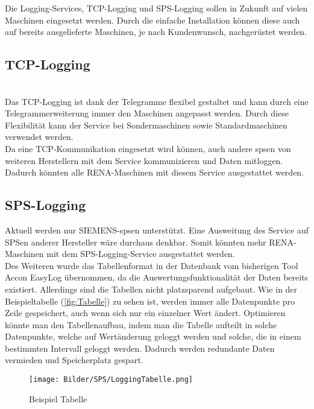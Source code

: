 Die Logging-Services, TCP-Logging  und SPS-Logging sollen in Zukunft auf vielen Maschinen eingesetzt werden. Durch die einfache Installation können diese auch auf bereits ausgelieferte Maschinen, je nach Kundenwunsch, nachgerüstet werden.
\subsection{TCP-Logging}
\ \\
Das TCP-Logging ist dank der Telegramme flexibel gestaltet und kann durch eine Telegrammerweiterung immer den Maschinen angepasst werden. Durch diese Flexibilität kann der Service bei Sondermaschinen sowie Standardmaschinen verwendet werden. 
\ \\
Da eine TCP-Kommunikation eingesetzt wird können, auch andere \ac{sps}en von weiteren Herstellern mit dem Service kommunizieren und Daten mitloggen. Dadurch könnten alle RENA-Maschinen mit diesem Service ausgestattet werden. 
\subsection{SPS-Logging}
Aktuell werden nur SIEMENS-\ac{sps}en unterstützt. Eine Ausweitung des Service auf SPSen anderer Hersteller wäre durchaus denkbar. Somit könnten mehr RENA-Maschinen mit dem SPS-Logging-Service ausgestattet werden. 
\ \\
Des Weiteren wurde das Tabellenformat in der Datenbank vom bisherigen Tool \glqq Accon EasyLog\grqq{} übernommen, da die Auswertungsfunktionalität der Daten bereits existiert. Allerdings sind die Tabellen nicht platzsparend aufgebaut. Wie in der Beispieltabelle (\autoref{fig:Tabelle}) zu sehen ist, werden immer alle Datenpunkte pro Zeile gespeichert, auch wenn sich nur ein einzelner Wert ändert. Optimieren könnte man den Tabellenaufbau, indem man die Tabelle aufteilt in solche Datenpunkte, welche auf Wertänderung geloggt werden und solche, die in einem bestimmten Intervall geloggt werden. Dadurch werden redundante Daten vermieden und Speicherplatz gespart. 

\begin{figure}
\centering
 \texttt{[image: Bilder/SPS/LoggingTabelle.png]}
 \caption[Beispiel Tabelle]{Beispiel Tabelle}
 \label{fig:Tabelle}
\end{figure}